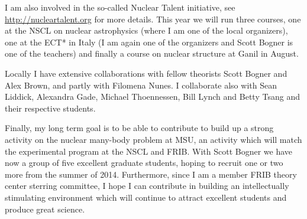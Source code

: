 \documentclass[prc,amsart,english,twocolumn,superscriptaddress,showpacs,floatfix]{revtex4}
\begin{document}
I am also involved in the so-called Nuclear Talent initiative, see \url{http://nucleartalent.org} for more details. 
This year we will run three courses,  one at the NSCL on nuclear astrophysics (where I am one of the local organizers), one at the ECT* in Italy (I am again one of the organizers and Scott Bogner is one of the teachers) and finally  a course on nuclear structure at Ganil in August.

Locally I have extensive collaborations with fellow theorists Scott Bogner and Alex Brown, and partly with Filomena Nunes. I collaborate also 
with 
Sean Liddick, Alexandra Gade, Michael Thoennessen, Bill Lynch and Betty  Tsang and their respective students. 

Finally, my long term goal is to be able to contribute to build up a strong activity on the nuclear many-body problem at MSU, an activity 
which will match the experimental program at the NSCL and FRIB. With Scott Bogner we have now a group of five excellent graduate students, hoping to recruit one or two more from the summer of 2014. Furthermore, since I am a member FRIB theory center sterring committee, I hope I can contribute in building an intellectually stimulating environment which will continue to attract excellent students and produce great science.


 
\end{document}
